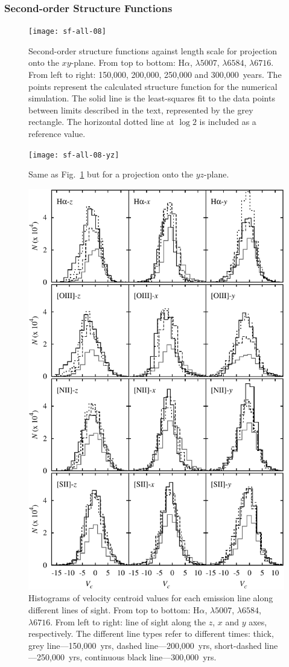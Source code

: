 \documentclass[useAMS,usenatbib]{mn2e}
\begin{document}
\subsubsection{Second-order Structure Functions}
\label{sssec:s2func}
\begin{figure}
\centering
\texttt{[image: sf-all-08]}
\caption{Second-order structure functions against length scale for
  projection onto the
  $xy$-plane. From top to bottom:
  H$\alpha$, \oiii$\lambda 5007$, \nii$\lambda 6584$, \sii$\lambda
  6716$. From left to right: 150,000, 200,000, 250,000 and
  300,000~years. The points represent the calculated structure
  function for the numerical simulation. The solid line is the
  least-squares fit to the data points between limits described in the
text, represented by the grey rectangle. The horizontal dotted line at $\log 2$ is included as a
reference value.}
\label{fig:sfunc}
\end{figure}
 \begin{figure}
 \centering
 \texttt{[image: sf-all-08-yz]}
 \caption{Same as Fig.~\protect\ref{fig:sfunc} but for a projection onto the $yz$-plane.}
 \label{fig:sfuncyz}
 \end{figure}
\begin{figure}
\centering
\includegraphics[width=0.6\linewidth]{pdf-centroid}
\caption{Histograms of velocity centroid values for each emission line
  along different lines of sight. From top to bottom:
  H$\alpha$, \oiii$\lambda 5007$, \nii$\lambda 6584$, \sii$\lambda
  6716$. From left to right: line of sight along the $z$, $x$ and $y$
  axes, respectively. The different line types refer to different
  times: thick, grey line---150,000~yrs, dashed line---200,000~yrs,
  short-dashed line---250,000~yrs, continuous black line---300,000~yrs.} 
\label{fig:histogram}
\end{figure}
\end{document}
